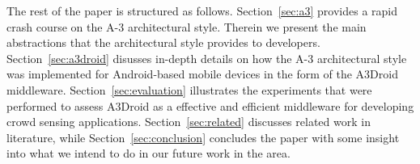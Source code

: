 The rest of the paper is structured as follows. Section~\ref{sec:a3} provides a rapid crash course on the A-3 architectural style. Therein we present the main abstractions that the architectural style provides to developers. Section~\ref{sec:a3droid} disusses in-depth details on how the A-3 architectural style was implemented for Android-based mobile devices in the form of the A3Droid middleware. Section~\ref{sec:evaluation} illustrates the experiments that were performed to assess A3Droid as a effective and efficient middleware for developing crowd sensing applications. Section~\ref{sec:related} discusses related work in literature, while Section~\ref{sec:conclusion} concludes the paper with some insight into what we intend to do in our future work in the area.











